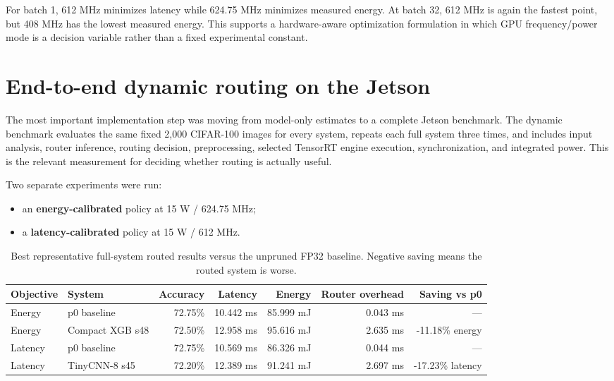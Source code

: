 \documentclass[11pt,a4paper]{article}
\begin{document}
For batch 1, 612 MHz minimizes latency while 624.75 MHz minimizes measured energy. At batch 32, 612 MHz is again the fastest point, but 408 MHz has the lowest measured energy. This supports a hardware-aware optimization formulation in which GPU frequency/power mode is a decision variable rather than a fixed experimental constant.

\section{End-to-end dynamic routing on the Jetson}

The most important implementation step was moving from model-only estimates to a complete Jetson benchmark. The dynamic benchmark evaluates the same fixed 2,000 CIFAR-100 images for every system, repeats each full system three times, and includes input analysis, router inference, routing decision, preprocessing, selected TensorRT engine execution, synchronization, and integrated power. This is the relevant measurement for deciding whether routing is actually useful.

Two separate experiments were run:
\begin{itemize}
    \item an \textbf{energy-calibrated} policy at 15 W / 624.75 MHz;
    \item a \textbf{latency-calibrated} policy at 15 W / 612 MHz.
\end{itemize}

\begin{table}[H]
\centering
\small
\caption{Best representative full-system routed results versus the unpruned FP32 baseline. Negative saving means the routed system is worse.}
\begin{tabularx}{\textwidth}{@{}lXrrrrr@{}}
\toprule
Objective & System & Accuracy & Latency & Energy & Router overhead & Saving vs p0 \\
\midrule
Energy & p0 baseline & 72.75\% & 10.442 ms & 85.999 mJ & 0.043 ms & --- \\
Energy & Compact XGB s48 & 72.50\% & 12.958 ms & 95.616 mJ & 2.635 ms & -11.18\% energy \\
\addlinespace
Latency & p0 baseline & 72.75\% & 10.569 ms & 86.326 mJ & 0.044 ms & --- \\
Latency & TinyCNN-8 s45 & 72.20\% & 12.389 ms & 91.241 mJ & 2.697 ms & -17.23\% latency \\
\bottomrule
\end{tabularx}
\label{tab:jetson-routing}
\end{table}
\end{document}
